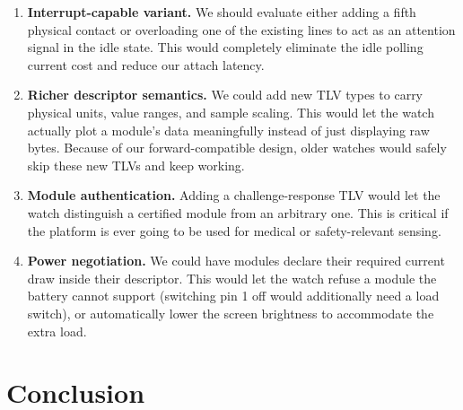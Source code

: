 \documentclass[12pt, a4paper]{article}
\begin{document}
\begin{enumerate}
  \item \textbf{Interrupt-capable variant.} We should evaluate either adding a fifth physical contact or overloading one of the existing lines to act as an attention signal in the idle state. This would completely eliminate the idle polling current cost and reduce our attach latency.

  \item \textbf{Richer descriptor semantics.} We could add new TLV types to carry physical units, value ranges, and sample scaling. This would let the watch actually plot a module's data meaningfully instead of just displaying raw bytes. Because of our forward-compatible design, older watches would safely skip these new TLVs and keep working.

  \item \textbf{Module authentication.} Adding a challenge-response TLV would let the watch distinguish a certified module from an arbitrary one. This is critical if the platform is ever going to be used for medical or safety-relevant sensing.

  \item \textbf{Power negotiation.} We could have modules declare their required current draw inside their descriptor. This would let the watch refuse a module the battery cannot support (switching pin 1 off would additionally need a load switch), or automatically lower the screen brightness to accommodate the extra load.
\end{enumerate}

\section{Conclusion}
\label{sec:conclusion}
\end{document}
